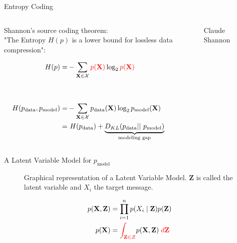 \documentclass[
	11pt, %
	aspectratio=169, %
]{beamer}
\begin{document}
\begin{frame}{Entropy Coding}
	 \begin{columns}[c] %
		\begin{column}{0.45\textwidth} %
			\begin{center}
			Shannon's source coding theorem:\\
			"The Entropy $H(p)$ is a lower bound for lossless data compression":
			\end{center}
			\begin{align*}
        	H(p) =& - \sum_{\mathbf{X}\in \mathcal{X}} \textcolor{red}{p(\mathbf{X})} \log_2 \textcolor{red}{p(\mathbf{X})}\\
			\\\vspace{1em}\\
        H(p_{\text{data}}, p_{\text{model}}) =& - \sum_{\mathbf{X}\in \mathcal{X}} p_{\text{data}}(\mathbf{X}) \log_2 p_{\text{model}}(\mathbf{X}) \\
        =& ~ H(p_{\text{data}}) + \underbrace{D_{KL}(p_{\text{data}} ||~ p_{\text{model}})}_{\text{modeling gap}}
			\end{align*}
		\end{column}
		\begin{column}{0.55\textwidth} %
        	\begin{figure}
        	    \centering
        	    \caption*{Claude Shannon}
        	\end{figure}
		\end{column}
	\end{columns}
\end{frame}

\begin{frame}{A Latent Variable Model for $p_{\text{model}}$}
		\begin{figure}[ht]
        \centering
        \caption{Graphical representation of a Latent Variable Model. $\mathbf{Z}$ is called the latent variable and  $X_i$ the target message.}
        \label{fig:LVM}
    \end{figure}
	\begin{align}
        p(\mathbf{X}, \mathbf{Z})&= \prod_{i=1}^{n}p(X_i\mid\mathbf{Z})p(\mathbf{Z}) \\
        p(\mathbf{X}) &=\textcolor{red}{\int_{\mathbf{Z} \in \mathcal{Z}}} p(\mathbf{X}, \mathbf{Z}) \; \textcolor{red}{d\mathbf{Z}}
	\end{align}
\end{frame}
\end{document}
